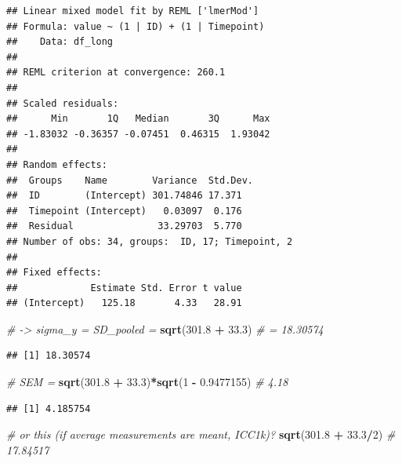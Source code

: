 \documentclass[
]{book}
\newenvironment{Shaded}{\begin{snugshade}}{\end{snugshade}}
\newcommand{\CommentTok}[1]{\textcolor[rgb]{0.56,0.35,0.01}{\textit{#1}}}
\newcommand{\DecValTok}[1]{\textcolor[rgb]{0.00,0.00,0.81}{#1}}
\newcommand{\FloatTok}[1]{\textcolor[rgb]{0.00,0.00,0.81}{#1}}
\newcommand{\FunctionTok}[1]{\textcolor[rgb]{0.13,0.29,0.53}{\textbf{#1}}}
\newcommand{\NormalTok}[1]{#1}
\newcommand{\SpecialCharTok}[1]{\textcolor[rgb]{0.81,0.36,0.00}{\textbf{#1}}}
\begin{document}
\begin{verbatim}
## Linear mixed model fit by REML ['lmerMod']
## Formula: value ~ (1 | ID) + (1 | Timepoint)
##    Data: df_long
## 
## REML criterion at convergence: 260.1
## 
## Scaled residuals: 
##      Min       1Q   Median       3Q      Max 
## -1.83032 -0.36357 -0.07451  0.46315  1.93042 
## 
## Random effects:
##  Groups    Name        Variance  Std.Dev.
##  ID        (Intercept) 301.74846 17.371  
##  Timepoint (Intercept)   0.03097  0.176  
##  Residual               33.29703  5.770  
## Number of obs: 34, groups:  ID, 17; Timepoint, 2
## 
## Fixed effects:
##             Estimate Std. Error t value
## (Intercept)   125.18       4.33   28.91
\end{verbatim}

\begin{Shaded}
\begin{Highlighting}[]
\CommentTok{\# {-}\textgreater{} sigma\_y = SD\_pooled = }
\FunctionTok{sqrt}\NormalTok{(}\FloatTok{301.8} \SpecialCharTok{+} \FloatTok{33.3}\NormalTok{) }\CommentTok{\# = 18.30574}
\end{Highlighting}
\end{Shaded}

\begin{verbatim}
## [1] 18.30574
\end{verbatim}

\begin{Shaded}
\begin{Highlighting}[]
\CommentTok{\# SEM = }
\FunctionTok{sqrt}\NormalTok{(}\FloatTok{301.8} \SpecialCharTok{+} \FloatTok{33.3}\NormalTok{)}\SpecialCharTok{*}\FunctionTok{sqrt}\NormalTok{(}\DecValTok{1} \SpecialCharTok{{-}} \FloatTok{0.9477155}\NormalTok{) }\CommentTok{\# 4.18}
\end{Highlighting}
\end{Shaded}

\begin{verbatim}
## [1] 4.185754
\end{verbatim}

\begin{Shaded}
\begin{Highlighting}[]
\CommentTok{\# or this (if average measurements are meant, ICC1k)?}
\FunctionTok{sqrt}\NormalTok{(}\FloatTok{301.8} \SpecialCharTok{+} \FloatTok{33.3}\SpecialCharTok{/}\DecValTok{2}\NormalTok{) }\CommentTok{\# 17.84517}
\end{Highlighting}
\end{Shaded}
\end{document}
